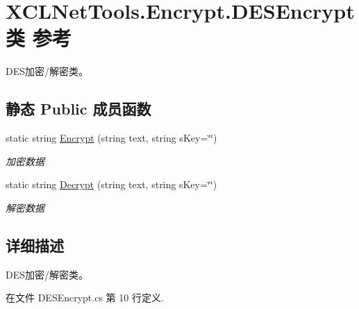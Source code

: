 \hypertarget{class_x_c_l_net_tools_1_1_encrypt_1_1_d_e_s_encrypt}{\section{X\-C\-L\-Net\-Tools.\-Encrypt.\-D\-E\-S\-Encrypt类 参考}
\label{class_x_c_l_net_tools_1_1_encrypt_1_1_d_e_s_encrypt}
}


D\-E\-S加密/解密类。  


\subsection*{静态 Public 成员函数}
\begin{DoxyCompactItemize}
\item 
static string \hyperlink{class_x_c_l_net_tools_1_1_encrypt_1_1_d_e_s_encrypt_a5bd946e26e2f43cc6b2d999df6b9d88d}{Encrypt} (string text, string s\-Key=\char`\"{}\char`\"{})
\begin{DoxyCompactList}\small\item\em 加密数据 \end{DoxyCompactList}\item 
static string \hyperlink{class_x_c_l_net_tools_1_1_encrypt_1_1_d_e_s_encrypt_a2455ab42f563bee03bf39c6f6eb9b2d1}{Decrypt} (string text, string s\-Key=\char`\"{}\char`\"{})
\begin{DoxyCompactList}\small\item\em 解密数据 \end{DoxyCompactList}\end{DoxyCompactItemize}


\subsection{详细描述}
D\-E\-S加密/解密类。 



在文件 D\-E\-S\-Encrypt.\-cs 第 10 行定义.



